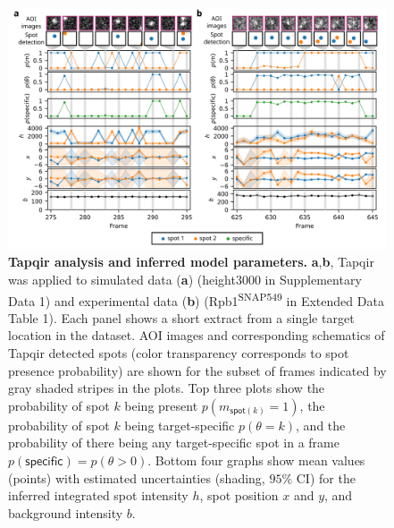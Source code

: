 \begin{figure}[h]
\end{figure}

\begin{figure}[h]
\centering
\includegraphics[width=\textwidth]{figures/figure3/figure3.png}
\caption{\textbf{Tapqir analysis and inferred model parameters.} \textbf{a},\textbf{b}, Tapqir was applied to simulated data (\textbf{a}) (height3000 in Supplementary Data 1) and experimental data (\textbf{b}) (Rpb1\textsuperscript{SNAP549} in Extended Data Table 1). Each panel shows a short extract from a single target location in the dataset. AOI images and corresponding schematics of Tapqir detected spots (color transparency corresponds to spot presence probability) are shown for the subset of frames indicated by gray shaded stripes in the plots. Top three plots show the probability of spot $k$ being present $p(m_{\mathsf{spot}(k)}=1)$, the probability of spot $k$ being target-specific $p(\theta=k)$, and the probability of there being any target-specific spot in a frame $p(\mathsf{specific}) = p(\theta>0)$.  Bottom four graphs show mean values (points) with estimated uncertainties (shading, $95\%$ CI) for the inferred integrated spot intensity $h$, spot position $x$ and $y$, and background intensity $b$. }
\label{fig:tapqir_analysis}
\end{figure}

